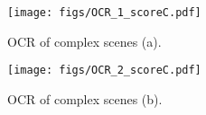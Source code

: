 \documentclass{article}
\begin{document}
\begin{figure}[!ht]
    \centering
    \texttt{[image: figs/OCR\_1\_scoreC.pdf]}
    \caption{OCR of complex scenes (a).}
    \label{fig:OCR_1_scoreC_a}
    \vspace{-2mm}
\end{figure}

\begin{figure}[!ht]
    \centering
    \texttt{[image: figs/OCR\_2\_scoreC.pdf]}
    \caption{OCR of complex scenes (b).}
    \label{fig:OCR_1_scoreC_b}
    \vspace{-2mm}
\end{figure}
\end{document}
